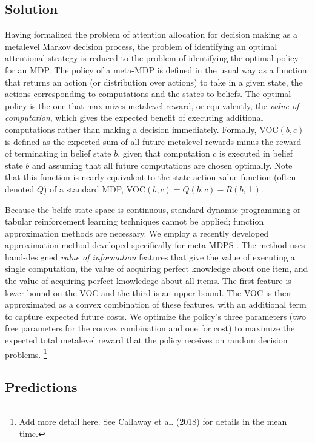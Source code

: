 \documentclass[12pt,a4paperpaper,]{article}
\begin{document}
\subsection{Solution}
Having formalized the problem of attention allocation for decision making as a metalevel Markov decision process, the problem of identifying an optimal attentional strategy is reduced to the problem of identifying the optimal policy for an MDP. The policy of a meta-MDP is defined in the usual way as a function that returns an action (or distribution over actions) to take in a given state, the actions corresponding to computations and the states to beliefs. The optimal policy is the one that maximizes metalevel reward, or equivalently, the \emph{value of computation}, which gives the expected benefit of executing additional computations rather than making a decision immediately. Formally, $\text{VOC}(b, c)$ is defined as the expected sum of all future metalevel rewards minus the reward of terminating in belief state $b$, given that computation $c$ is executed in belief state $b$ and assuming that all future computations are chosen optimally. Note that this function is nearly equivalent to the state-action value function (often denoted $Q$) of a standard MDP, $\text{VOC}(b, c) = Q(b, c) - R(b, \bot)$.

Because the belife state space is continuous, standard dynamic programming or tabular reinforcement learning techniques cannot be applied; function approximation methods are necessary. We employ a recently developed approximation method developed specifically for meta-MDPS \citep{callaway2018learning}. The method uses hand-designed \emph{value of information} features that give the value of executing a single computation, the value of acquiring perfect knowledge about one item, and the value of acquiring perfect knowledege about all items. The first feature is lower bound on the VOC and the third is an upper bound. The VOC is then approximated as a convex combination of these features, with an additional term to capture expected future costs. We optimize the policy's three parameters (two free parameters for the convex combination and one for cost) to maximize the expected total metalevel reward that the policy receives on random decision problems.%
  \footnote{Add more detail here. See Callaway et al. (2018) for details in the mean time.}


\subsection{Predictions}
\end{document}
